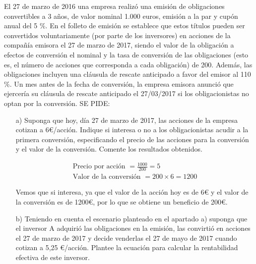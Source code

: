 El 27 de marzo de 2016 una empresa realizó una emisión de obligaciones convertibles a 3 años, de valor nominal 1.000 euros, emisión a la par y cupón anual del 5 \%. En el folleto de emisión se establece que estos títulos pueden ser convertidos voluntariamente (por parte de los inversores) en acciones de la compañía emisora el 27 de marzo de 2017, siendo el valor de la obligación a efectos de conversión el nominal y la tasa de conversión de las obligaciones (esto es, el número de acciones que corresponda a cada obligación) de 200. Además, las obligaciones incluyen una cláusula de rescate anticipado a favor del emisor al 110 \%. Un mes antes de la fecha de conversión, la empresa emisora anunció que ejercería su cláusula de rescate anticipado el 27/03/2017 si los obligacionistas no optan por la conversión. SE PIDE:
\begin{enumerate}
    \item[a)] Suponga que hoy, día 27 de marzo de 2017, las acciones de la empresa cotizan a 6€/acción. Indique si interesa o no a los obligacionistas acudir a la primera conversión, especificando el precio de las acciones para la conversión y el valor de la conversión. Comente los resultados obtenidos.
    
    \begin{align*}
        \text{Precio por acción }  =\frac{1000}{200} = 5 \\
        \text{Valor de la conversión } = 200 \times 6 = 1200
    \end{align*}

    Vemos que si interesa, ya que el valor de la acción hoy es de 6€ y el valor de la conversión es de 1200€, por lo que se obtiene un beneficio de 200€.

    \item[b)] Teniendo en cuenta el escenario planteado en el apartado a) suponga que el inversor A adquirió las obligaciones en la emisión, las convirtió en acciones el 27 de marzo de 2017 y decide venderlas el 27 de mayo de 2017 cuando cotizan a 5,25 €/acción. Plantee la ecuación para calcular la rentabilidad efectiva de este inversor.
    
\end{enumerate}
